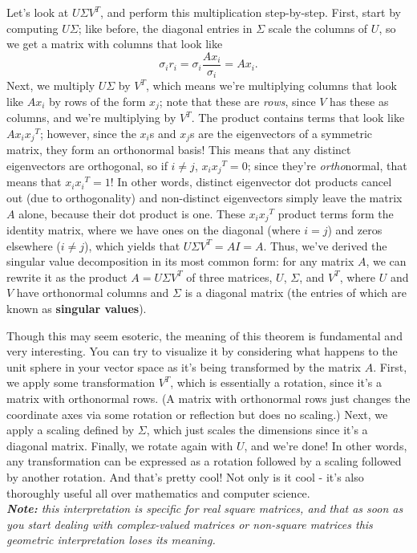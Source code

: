 \documentclass[11pt]{article}
\begin{document}
Let's look at $U\Sigma V^T$, and perform this multiplication step-by-step. First, start by computing
$U\Sigma$; like before, the diagonal entries in $\Sigma$ scale the columns of $U$, so we get a
matrix with columns that look like 
\[\sigma_i r_i = \sigma_i \frac{A x_i}{\sigma_i} = A x_i.\] 
Next, we multiply $U\Sigma$ by $V^T$, which means we're multiplying columns that look like $Ax_i$ by
rows of the form $x_j$; note that these are \emph{rows}, since $V$ has these as columns, and we're
multiplying by $V^T$. The product contains terms that look like $Ax_i {x_j}^T$; however, since the
$x_i$s and $x_j$s are the eigenvectors of a symmetric matrix, they form an orthonormal basis! This
means that any distinct eigenvectors are orthogonal, so if $i \ne j$, $x_i {x_j}^T = 0$; since
they're \emph{ortho}normal, that means that $x_i {x_i}^T = 1$! In other words, distinct eigenvector
dot products cancel out (due to orthogonality) and non-distinct eigenvectors simply leave the matrix
$A$ alone, because their dot product is one. These $x_i {x_j}^T$ product terms form the identity
matrix, where we have ones on the diagonal (where $i = j$) and zeros elsewhere ($i \ne j$), which
yields that $U\Sigma V^T = AI = A$. Thus, we've derived the singular value decomposition in its most
common form: for any matrix $A$, we can rewrite it as the product $A = U\Sigma V^T$ of three
matrices, $U$, $\Sigma$, and $V^T$, where $U$ and $V$ have orthonormal columns and $\Sigma$ is a
diagonal matrix (the entries of which are known as \textbf{singular values}).

Though this may seem esoteric, the meaning of this theorem is fundamental and very interesting. You
can try to visualize it by considering what happens to the unit sphere in your vector space as it's
being transformed by the matrix $A$. First, we apply some transformation $V^T$, which is essentially
a rotation, since it's a matrix with orthonormal rows. (A matrix with orthonormal rows just
changes the coordinate axes via some rotation or reflection but does no scaling.) Next, we apply a
scaling defined by $\Sigma$, which just scales the dimensions since it's a diagonal matrix. Finally,
we rotate again with $U$, and we're done! In other words, any transformation can be expressed as a
rotation followed by a scaling followed by another rotation. And that's pretty cool! Not only is it
cool - it's also thoroughly useful all over mathematics and computer science.\\

\noindent \emph{\textbf{Note:} this interpretation is specific for real square matrices, and that as soon as you start
dealing with complex-valued matrices or non-square matrices this geometric interpretation loses its
meaning.}
\end{document}
